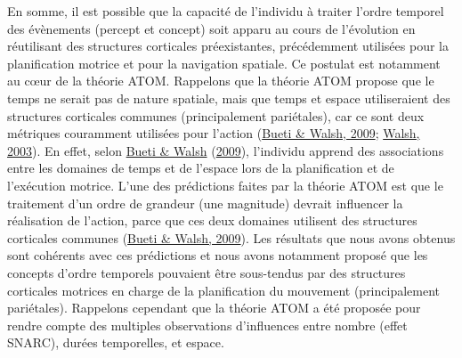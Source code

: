 \documentclass[
  a4paper,12pt,twoside,onecolumn,openright,final,oldfontcommands]{memoir}
\begin{document}
En somme, il est possible que la capacité de l'individu à traiter l'ordre temporel des évènements (percept et concept) soit apparu au cours de l'évolution en réutilisant des structures corticales préexistantes, précédemment utilisées pour la planification motrice et pour la navigation spatiale. Ce postulat est notamment au cœur de la théorie ATOM. Rappelons que la théorie ATOM propose que le temps ne serait pas de nature spatiale, mais que temps et espace utiliseraient des structures corticales communes (principalement pariétales), car ce sont deux métriques couramment utilisées pour l'action (\protect\hyperlink{ref-bueti_parietal_2009}{Bueti \& Walsh, 2009}; \protect\hyperlink{ref-walsh_theory_2003}{Walsh, 2003}). En effet, selon \protect\hyperlink{ref-bueti_parietal_2009}{Bueti \& Walsh} (\protect\hyperlink{ref-bueti_parietal_2009}{2009}), l'individu apprend des associations entre les domaines de temps et de l'espace lors de la planification et de l'exécution motrice. L'une des prédictions faites par la théorie ATOM est que le traitement d'un ordre de grandeur (une magnitude) devrait influencer la réalisation de l'action, parce que ces deux domaines utilisent des structures corticales communes (\protect\hyperlink{ref-bueti_parietal_2009}{Bueti \& Walsh, 2009}). Les résultats que nous avons obtenus sont cohérents avec ces prédictions et nous avons notamment proposé que les concepts d'ordre temporels pouvaient être sous-tendus par des structures corticales motrices en charge de la planification du mouvement (principalement pariétales). Rappelons cependant que la théorie ATOM a été proposée pour rendre compte des multiples observations d'influences entre nombre (effet SNARC), durées temporelles, et espace.
\end{document}
